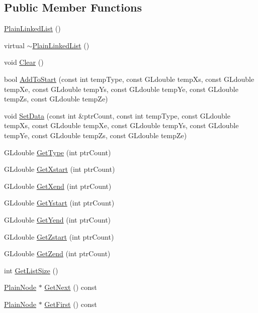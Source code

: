 \subsection*{Public Member Functions}
\begin{DoxyCompactItemize}
\item 
\hyperlink{class_plain_linked_list_a65df7dd185ebd991725900eb587f96a8}{Plain\+Linked\+List} ()
\item 
virtual \hyperlink{class_plain_linked_list_a9b11aabf026e1d65cbf16e854ff46533}{$\sim$\+Plain\+Linked\+List} ()
\item 
void \hyperlink{class_plain_linked_list_a836472749021aa66632a7adb79f210a2}{Clear} ()
\item 
bool \hyperlink{class_plain_linked_list_a4d9d62421c215a3c9e2c9ef0833b84a1}{Add\+To\+Start} (const int temp\+Type, const G\+Ldouble temp\+Xs, const G\+Ldouble temp\+Xe, const G\+Ldouble temp\+Ys, const G\+Ldouble temp\+Ye, const G\+Ldouble temp\+Zs, const G\+Ldouble temp\+Ze)
\item 
void \hyperlink{class_plain_linked_list_acc66c25c1c1bb911b7cdb22da14cb6de}{Set\+Data} (const int \&ptr\+Count, const int temp\+Type, const G\+Ldouble temp\+Xs, const G\+Ldouble temp\+Xe, const G\+Ldouble temp\+Ys, const G\+Ldouble temp\+Ye, const G\+Ldouble temp\+Zs, const G\+Ldouble temp\+Ze)
\item 
G\+Ldouble \hyperlink{class_plain_linked_list_ad10e61ef1f9a9479b7b64d396e4e34cc}{Get\+Type} (int ptr\+Count)
\item 
G\+Ldouble \hyperlink{class_plain_linked_list_a2085c878239f34eb9a17822756c39461}{Get\+Xstart} (int ptr\+Count)
\item 
G\+Ldouble \hyperlink{class_plain_linked_list_aca26ded8e3d474096f32ccf8c3b2157f}{Get\+Xend} (int ptr\+Count)
\item 
G\+Ldouble \hyperlink{class_plain_linked_list_ad0b9f3d62cc92f26ec919c3bde7fdd22}{Get\+Ystart} (int ptr\+Count)
\item 
G\+Ldouble \hyperlink{class_plain_linked_list_a82ff501e86ac795549d28067ae70441b}{Get\+Yend} (int ptr\+Count)
\item 
G\+Ldouble \hyperlink{class_plain_linked_list_a597babac3511eca108443d88d0b0cbf8}{Get\+Zstart} (int ptr\+Count)
\item 
G\+Ldouble \hyperlink{class_plain_linked_list_af5801f80f8cac4465eadfd0bec88704c}{Get\+Zend} (int ptr\+Count)
\item 
int \hyperlink{class_plain_linked_list_a5c8077af674e9abc6fc6062f7460dd35}{Get\+List\+Size} ()
\item 
\hyperlink{class_plain_node}{Plain\+Node} $\ast$ \hyperlink{class_plain_linked_list_a5dfca19e3a7696030fb8c556c8534ff3}{Get\+Next} () const 
\item 
\hyperlink{class_plain_node}{Plain\+Node} $\ast$ \hyperlink{class_plain_linked_list_a78efbfbf61bb0544ce43263eef8f7b95}{Get\+First} () const 
\end{DoxyCompactItemize}
